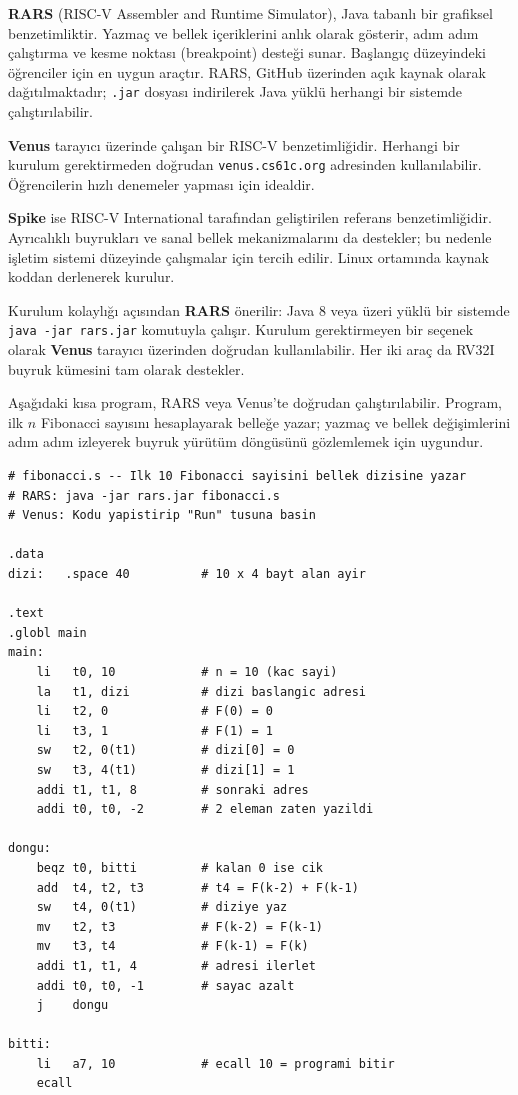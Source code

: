 \textbf{RARS} (RISC-V Assembler and Runtime Simulator), Java tabanlı bir grafiksel benzetimliktir. Yazmaç ve bellek içeriklerini anlık olarak gösterir, adım adım çalıştırma ve kesme noktası (breakpoint) desteği sunar. Başlangıç düzeyindeki öğrenciler için en uygun araçtır. RARS, GitHub üzerinden açık kaynak olarak dağıtılmaktadır; \texttt{.jar} dosyası indirilerek Java yüklü herhangi bir sistemde çalıştırılabilir.

\textbf{Venus} tarayıcı üzerinde çalışan bir RISC-V benzetimliğidir. Herhangi bir kurulum gerektirmeden doğrudan \texttt{venus.cs61c.org} adresinden kullanılabilir. Öğrencilerin hızlı denemeler yapması için idealdir.

\textbf{Spike} ise RISC-V International tarafından geliştirilen referans benzetimliğidir. Ayrıcalıklı buyrukları ve sanal bellek mekanizmalarını da destekler; bu nedenle işletim sistemi düzeyinde çalışmalar için tercih edilir. Linux ortamında kaynak koddan derlenerek kurulur.

\begin{bilginot}
Kurulum kolaylığı açısından \textbf{RARS} önerilir: Java 8 veya üzeri yüklü bir sistemde \texttt{java -jar rars.jar} komutuyla çalışır. Kurulum gerektirmeyen bir seçenek olarak \textbf{Venus} tarayıcı üzerinden doğrudan kullanılabilir. Her iki araç da RV32I buyruk kümesini tam olarak destekler.
\end{bilginot}

Aşağıdaki kısa program, RARS veya Venus'te doğrudan çalıştırılabilir. Program, ilk $n$ Fibonacci sayısını hesaplayarak belleğe yazar; yazmaç ve bellek değişimlerini adım adım izleyerek buyruk yürütüm döngüsünü gözlemlemek için uygundur.

\begin{lstlisting}[style=riscv, caption={Fibonacci sayıları (RARS/Venus ile çalıştırılabilir)}, label={lst:ekd-fibonacci}]
# fibonacci.s -- Ilk 10 Fibonacci sayisini bellek dizisine yazar
# RARS: java -jar rars.jar fibonacci.s
# Venus: Kodu yapistirip "Run" tusuna basin

.data
dizi:   .space 40          # 10 x 4 bayt alan ayir

.text
.globl main
main:
    li   t0, 10            # n = 10 (kac sayi)
    la   t1, dizi          # dizi baslangic adresi
    li   t2, 0             # F(0) = 0
    li   t3, 1             # F(1) = 1
    sw   t2, 0(t1)         # dizi[0] = 0
    sw   t3, 4(t1)         # dizi[1] = 1
    addi t1, t1, 8         # sonraki adres
    addi t0, t0, -2        # 2 eleman zaten yazildi

dongu:
    beqz t0, bitti         # kalan 0 ise cik
    add  t4, t2, t3        # t4 = F(k-2) + F(k-1)
    sw   t4, 0(t1)         # diziye yaz
    mv   t2, t3            # F(k-2) = F(k-1)
    mv   t3, t4            # F(k-1) = F(k)
    addi t1, t1, 4         # adresi ilerlet
    addi t0, t0, -1        # sayac azalt
    j    dongu

bitti:
    li   a7, 10            # ecall 10 = programi bitir
    ecall
\end{lstlisting}

